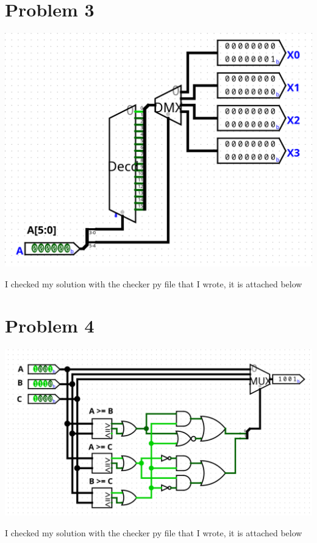 \documentclass[12pt]{article}
\begin{document}
\section*{Problem 3}
\begin{center}
   \includegraphics[scale=0.25]{Problem3.png}
\end{center}
I checked my solution with the checker py file that I wrote, it  is attached below
\section*{Problem 4}
\begin{center}
   \includegraphics[scale=0.25]{Problem4.png}
\end{center}
I checked my solution with the checker py file that I wrote, it  is attached below
\end{document}
